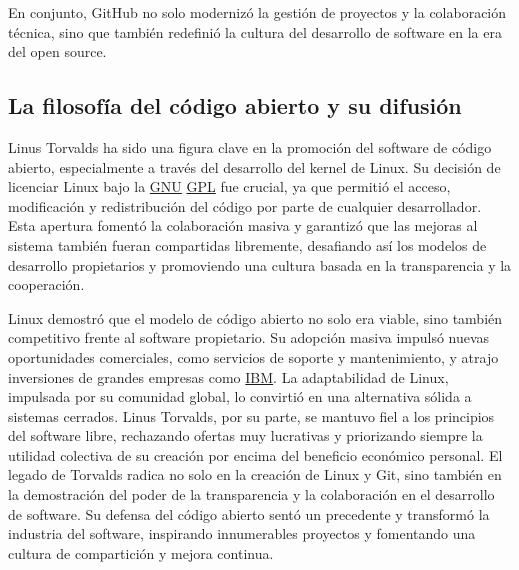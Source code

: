 \documentclass[a4paper,12pt]{article}
\begin{document}
En conjunto, GitHub no solo modernizó la gestión de proyectos y la colaboración
técnica, sino que también redefinió la cultura del desarrollo de software en la
era del open source.

\subsection{La filosofía del código abierto y su difusión} 

Linus Torvalds ha sido una figura clave en la promoción del software de código
abierto, especialmente a través del desarrollo del kernel de Linux. Su decisión
de licenciar Linux bajo la \hyperref[gnu]{GNU} \hyperref[gpl]{GPL} fue crucial, ya que permitió el acceso,
modificación y redistribución del código por parte de cualquier desarrollador.
Esta apertura fomentó la colaboración masiva y garantizó que las mejoras al
sistema también fueran compartidas libremente, desafiando así los modelos de
desarrollo propietarios y promoviendo una cultura basada en la transparencia y
la cooperación.

Linux demostró que el modelo de código abierto no solo era viable, sino también
competitivo frente al software propietario. Su adopción masiva impulsó nuevas
oportunidades comerciales, como servicios de soporte y mantenimiento, y atrajo
inversiones de grandes empresas como \hyperref[ibm]{IBM}. La adaptabilidad de Linux, impulsada
por su comunidad global, lo convirtió en una alternativa sólida a sistemas
cerrados. Linus Torvalds, por su parte, se mantuvo fiel a los principios del
software libre, rechazando ofertas muy lucrativas y priorizando siempre la utilidad
colectiva de su creación por encima del beneficio económico personal. 
El legado de Torvalds radica no solo en la creación de Linux y Git, sino también en la
demostración del poder de la transparencia y la colaboración en el desarrollo de
software. Su defensa del código abierto sentó un precedente y transformó la
industria del software, inspirando innumerables proyectos y fomentando una
cultura de compartición y mejora continua. 

\end{document}
